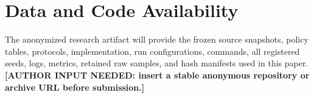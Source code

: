 \section*{Data and Code Availability}

The anonymized research artifact will provide the frozen source snapshots, policy tables, protocols, implementation, run configurations, commands, all registered seeds, logs, metrics, retained raw samples, and hash manifests used in this paper. \textbf{[AUTHOR INPUT NEEDED: insert a stable anonymous repository or archive URL before submission.]}

